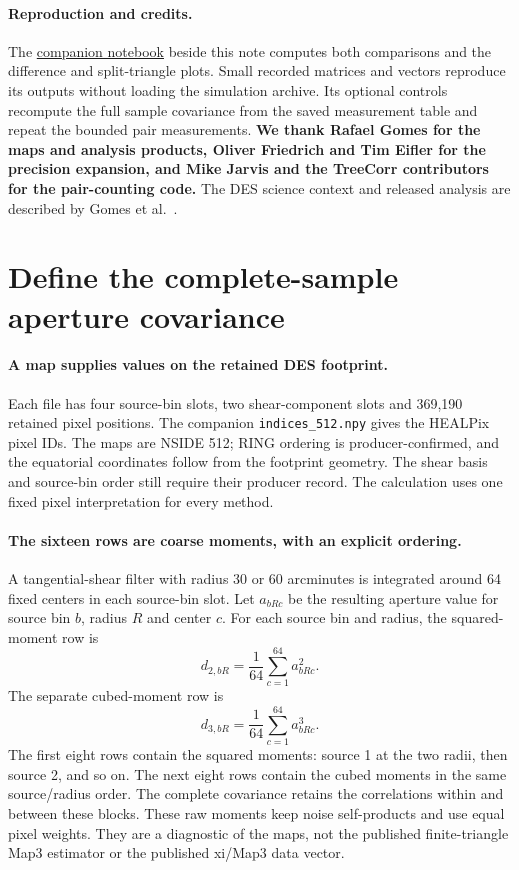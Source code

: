 \documentclass[11pt]{article}
\begin{document}
\paragraph{Reproduction and credits.}
The \href{EXAMPLE_COVARIANCE_COMPARISON.ipynb}{companion notebook} beside
this note computes both comparisons and the difference and split-triangle
plots. Small recorded matrices and vectors reproduce its outputs without
loading the simulation archive. Its optional controls recompute the full
sample covariance from the saved measurement table and repeat the bounded
pair measurements. \textbf{We thank Rafael Gomes for the maps and analysis
products, Oliver Friedrich and Tim Eifler for the precision expansion,
and Mike Jarvis and the TreeCorr contributors for the pair-counting code.}
The DES science context and released analysis are described by
Gomes et al.~\cite{gomes}.

\section{Define the complete-sample aperture covariance}
\paragraph{A map supplies values on the retained DES footprint.}
Each file has four source-bin slots, two shear-component slots and 369,190
retained pixel positions. The companion \nolinkurl{indices_512.npy} gives
the HEALPix pixel IDs. The maps are NSIDE 512; RING ordering is producer-confirmed, and the
equatorial coordinates follow from the footprint geometry. The shear basis
and source-bin order still require their producer record. The calculation uses
one fixed pixel interpretation for every method.

\paragraph{The sixteen rows are coarse moments, with an explicit ordering.}
A tangential-shear filter with radius 30 or 60 arcminutes is integrated
around 64 fixed centers in each source-bin slot. Let $a_{bRc}$ be the
resulting aperture value for source bin $b$, radius $R$ and center $c$.
For each source bin and radius, the squared-moment row is
\begin{equation}
 d_{2,bR}=\frac{1}{64}\sum_{c=1}^{64}a_{bRc}^2.
\end{equation}
The separate cubed-moment row is
\begin{equation}
 d_{3,bR}=\frac{1}{64}\sum_{c=1}^{64}a_{bRc}^3.
\end{equation}
The first eight rows contain the squared moments: source 1 at the two
radii, then source 2, and so on. The next eight rows contain the cubed
moments in the same source/radius order. The complete covariance retains
the correlations within and between these blocks. These raw moments keep
noise self-products and use equal pixel weights. They are a diagnostic of
the maps, not the published finite-triangle Map3 estimator or the published
xi/Map3 data vector.
\end{document}
